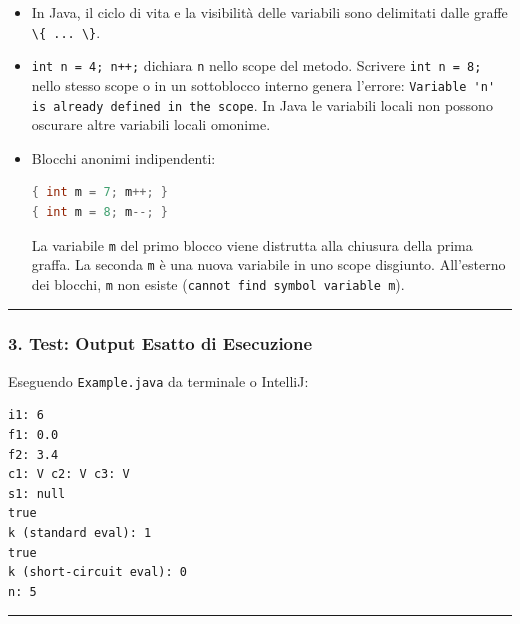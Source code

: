 \documentclass[11pt,a4paper]{article}
\newcommand{\passthrough}[1]{#1}
\begin{document}
\begin{enumerate}
  \begin{itemize}
  \item
    In Java, il ciclo di vita e la visibilità delle variabili sono
    delimitati dalle graffe \passthrough{\lstinline!\{ ... \}!}.
  \item
    \passthrough{\lstinline!int n = 4; n++;!} dichiara
    \passthrough{\lstinline!n!} nello scope del metodo. Scrivere
    \passthrough{\lstinline!int n = 8;!} nello stesso scope o in un
    sottoblocco interno genera l'errore:
    \passthrough{\lstinline!Variable 'n' is already defined in the scope!}.
    In Java le variabili locali non possono oscurare altre variabili
    locali omonime.
  \item
    Blocchi anonimi indipendenti:

\begin{lstlisting}[language=Java]
{ int m = 7; m++; }
{ int m = 8; m--; }
\end{lstlisting}

    La variabile \passthrough{\lstinline!m!} del primo blocco viene
    distrutta alla chiusura della prima graffa. La seconda
    \passthrough{\lstinline!m!} è una nuova variabile in uno scope
    disgiunto. All'esterno dei blocchi, \passthrough{\lstinline!m!} non
    esiste (\passthrough{\lstinline!cannot find symbol variable m!}).
  \end{itemize}
\end{enumerate}

\begin{center}\rule{0.5\linewidth}{0.5pt}\end{center}

\subsubsection{3. Test: Output Esatto di
Esecuzione}\label{test-output-esatto-di-esecuzione}

Eseguendo \passthrough{\lstinline!Example.java!} da terminale o
IntelliJ:

\begin{lstlisting}
i1: 6
f1: 0.0
f2: 3.4
c1: V c2: V c3: V
s1: null
true
k (standard eval): 1
true
k (short-circuit eval): 0
n: 5
\end{lstlisting}

\begin{center}\rule{0.5\linewidth}{0.5pt}\end{center}
\end{document}
